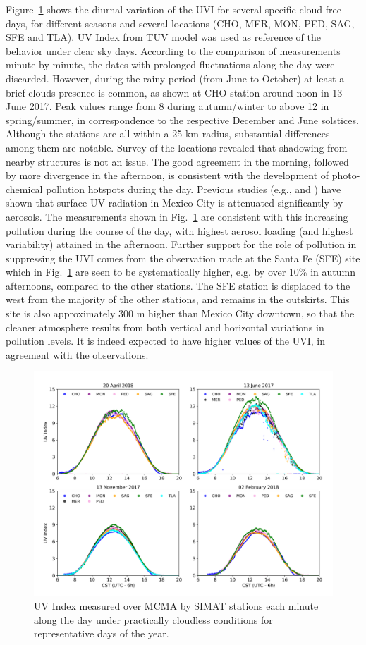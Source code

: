 \documentclass[journal=jacsat,manuscript=article]{achemso}
\begin{document}
Figure~{\ref{628947}} shows the diurnal variation of
the UVI for several specific cloud-free days, for different seasons and
several locations (CHO, MER, MON, PED, SAG, SFE and TLA). UV Index from
TUV model was used as reference of the behavior under clear sky days.
According to the comparison of measurements minute by minute, the dates
with prolonged fluctuations along the day were discarded. However,
during the rainy period (from June to October) at least a brief clouds
presence is common, as shown at CHO station around noon in 13 June
2017. Peak values range from 8 during autumn/winter to above 12
in spring/summer, in correspondence to the respective December and June
solstices. Although the stations are all within a 25 km radius,
substantial differences among them are notable. Survey of the locations
revealed that shadowing from nearby structures is not an issue. The good
agreement in the morning, followed by more divergence in the afternoon,
is consistent with the development of photo-chemical pollution hotspots
during the day. Previous studies (e.g., \citet{Castro_2001} and
\citet{Palancar_2013}) have shown
that surface UV radiation in Mexico City is attenuated significantly by
aerosols. The measurements shown in Fig.~{\ref{628947}}
are consistent with this increasing pollution during the course of the
day, with highest aerosol loading (and highest variability) attained in
the afternoon. Further support for the role of pollution in suppressing
the UVI comes from the observation made at the Santa Fe (SFE) site which
in Fig.~{\ref{628947}} are seen to be systematically
higher, e.g. by over 10\% in autumn afternoons, compared to the other
stations. The SFE station is displaced to the west from the majority of
the other stations, and remains in the outskirts. This site is also
approximately 300 m higher than Mexico City downtown, so that the
cleaner atmosphere results from both vertical and horizontal variations
in pollution levels.\citep{SEDEMA2018a} It is indeed expected to have
higher values of the UVI, in agreement with the observations.

\begin{figure}[H]
  \begin{center}
    \includegraphics[width=0.70\columnwidth]{figures/season}
    \caption{{UV Index measured over MCMA by SIMAT stations each minute along the day
          under practically cloudless conditions for representative days of the
          year.
            {\label{628947}}%
        }}
  \end{center}
\end{figure}
\end{document}
